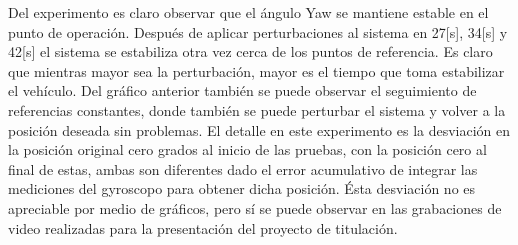 \documentclass[../main.tex]{subfiles}
\begin{document}
Del experimento es claro observar que el ángulo Yaw se mantiene estable
en el punto de operación. Después de aplicar perturbaciones al sistema
en 27{[}s{]}, 34{[}s{]} y 42{[}s{]} el sistema se estabiliza otra
vez cerca de los puntos de referencia. Es claro que mientras mayor
sea la perturbación, mayor es el tiempo que toma estabilizar el vehículo.
Del gráfico anterior también se puede observar el seguimiento de referencias
constantes, donde también se puede perturbar el sistema y volver a
la posición deseada sin problemas. El detalle en este experimento
es la desviación en la posición original cero grados al inicio de
las pruebas, con la posición cero al final de estas, ambas son diferentes
dado el error acumulativo de integrar las mediciones del gyroscopo
para obtener dicha posición. Ésta desviación no es apreciable por medio de gráficos, pero sí se puede observar en las grabaciones de video realizadas para la presentación del proyecto de titulación.
\end{document}
